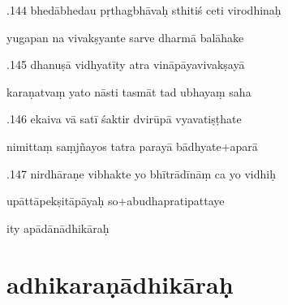 \documentclass[article,12pt,a4paper]{memoir}%
\newcounter{parCount}
\begin{document}
	  
	  \pstart {}.144 bhedābhedau pṛthagbhāvaḥ sthitiś ceti virodhinaḥ 
	{}
	\pend%
      

	  
	  \pstart \leavevmode%
	yugapan na vivakṣyante sarve dharmā balāhake 
	{}
	\pend%
      

	  
	  \pstart {}.145 dhanuṣā vidhyatīty atra vināpāyavivakṣayā 
	{}
	\pend%
      

	  
	  \pstart \leavevmode%
	karaṇatvaṃ yato nāsti tasmāt tad ubhayaṃ saha 
	{}
	\pend%
      

	  
	  \pstart {}.146 ekaiva vā satī śaktir dvirūpā vyavatiṣṭhate 
	{}
	\pend%
      

	  
	  \pstart \leavevmode%
	nimittaṃ saṃjñayos tatra parayā bādhyate+aparā 
	{}
	\pend%
      

	  
	  \pstart {}.147 nirdhāraṇe vibhakte yo bhītrādīnāṃ ca yo vidhiḥ 
	{}
	\pend%
      

	  
	  \pstart \leavevmode%
	upāttāpekṣitāpāyaḥ so+abudhapratipattaye 
	{}
	\pend%
      

	  
	  \pstart \leavevmode%
	ity apādānādhikāraḥ
	{}
	\pend%
      
	  
	
\chapter[{adhikaraṇādhikāraḥ}][{adhikaraṇādhikāraḥ}]{ adhikaraṇādhikāraḥ}
\end{document}
